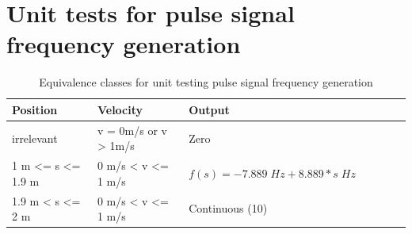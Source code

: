 \section{Unit tests for pulse signal frequency generation}

\begin{table}[H]
\centering
\caption{Equivalence classes for unit testing pulse signal frequency generation}
\begin{adjustbox}{width=1\textwidth, center=\textwidth}
\renewcommand{\arraystretch}{1}
\begin{tabular}{lllllll}
\textbf{Position} & \textbf{Velocity} & \textbf{Output} \\\hline
irrelevant & v = 0m/s or v > 1m/s & Zero\\
1 m <= s <= 1.9 m  & 0 m/s < v <= 1 m/s & $f(s)=-7.889\; Hz + 8.889*s\; Hz$\\
1.9 m < s <= 2 m  & 0 m/s < v <= 1 m/s & Continuous (10)
\end{tabular}
\end{adjustbox}
\end{table}

